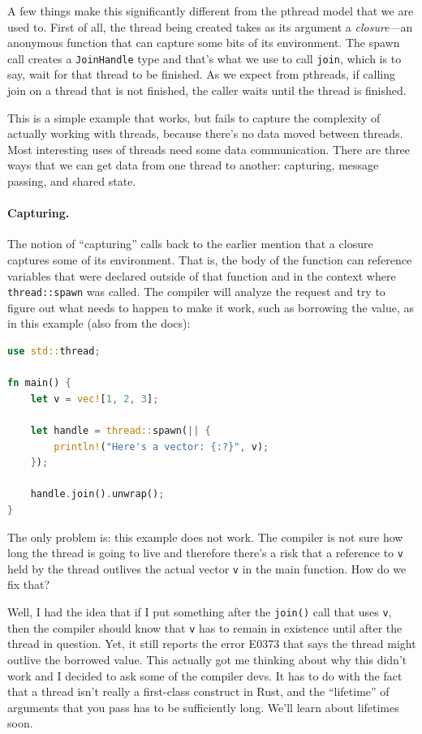 \documentclass[a4paper]{report}
\begin{document}
A few things make this significantly different from the pthread model that we are used to. First of all, the thread being created takes as its argument a \textit{closure}---an anonymous function that can capture some bits of its environment. The spawn call creates a \texttt{JoinHandle} type and that's what we use to call \texttt{join}, which is to say, wait for that thread to be finished. As we expect from pthreads, if calling join on a thread that is not finished, the caller waits until the thread is finished.

This is a simple example that works, but fails to capture the complexity of actually working with threads, because there's no data moved between threads. Most interesting uses of threads need some data communication. There are three ways that we can get data from one thread to another: capturing, message passing, and shared state.

\paragraph{Capturing.} 
The notion of ``capturing'' calls back to the earlier mention that a closure captures some of its environment. That is, the body of the function can reference variables that were declared outside of that function and in the context where \texttt{thread::spawn} was called. The compiler will analyze the request and try to figure out what needs to happen to make it work, such as borrowing the value, as in this example (also from the docs):

\begin{lstlisting}[language=Rust]
use std::thread;

fn main() {
    let v = vec![1, 2, 3];

    let handle = thread::spawn(|| {
        println!("Here's a vector: {:?}", v);
    });

    handle.join().unwrap();
}
\end{lstlisting}

The only problem is: this example does not work. The compiler is not sure how long the thread is going to live and therefore there's a risk that a reference to \texttt{v} held by the thread outlives the actual vector \texttt{v} in the main function. How do we fix that?

Well, I had the idea that if I put something after the \texttt{join()} call that uses \texttt{v}, then the compiler should know that \texttt{v} has to remain in existence until after the thread in question. Yet, it still reports the error E0373 that says the thread might outlive the borrowed value. This actually got me thinking about why this didn't work and I decided to ask some of the compiler devs. It has to do with the fact that a thread isn't really a first-class construct in Rust, and the ``lifetime'' of arguments that you pass has to be sufficiently long. We'll learn about lifetimes soon.
\end{document}
